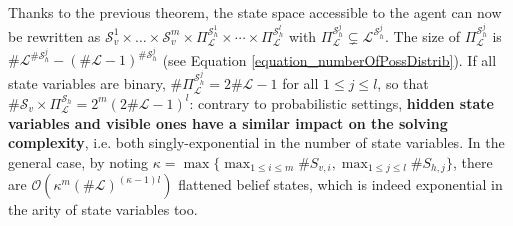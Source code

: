 Thanks to the previous theorem, the state space accessible to the agent can now be rewritten as 
$\mathcal{S}^1_v \times \ldots \times
\mathcal{S}^m_v \times \Pi^{\mathcal{S}^1_h}_{\mathcal{L}} \times \cdots \times \Pi^{\mathcal{S}^l_h}_{\mathcal{L}}$ 
with $\Pi^{\mathcal{S}^j_h}_{\mathcal{L}}
\subsetneq \mathcal{L}^{\mathcal{S}^j_h}$. 
The size of $\Pi^{\mathcal{S}^j_h}_{\mathcal{L}}$
is $\#\mathcal{L}^{\#\mathcal{S}^j_h} - (\#\mathcal{L}-1)^{\#\mathcal{S}^j_h}$
(see Equation \ref{equation_numberOfPossDistrib}). 
If all state variables are binary,
$\# \Pi^{\mathcal{S}^j_h}_{\mathcal{L}} = 2 \#\mathcal{L} - 1$ for all $1 \leqslant j \leqslant l$, so that 
$\# \mathcal{S}_v \times \Pi^{\mathcal{S}_h}_{\mathcal{L}} = 2^m (2
\#\mathcal{L} - 1)^l$: contrary to probabilistic settings, {\bf hidden state variables
and visible ones have a similar impact on the solving complexity}, i.e. both
singly-exponential in the number of state variables. 
In the general case, by noting 
$\kappa = \max\{\max_{1 \leqslant i \leqslant m} \# S_{v,i} , \max_{1 \leqslant j \leqslant l} \# S_{h,j}\}$, 
there are $\mathcal{O}(\kappa^m (\# \mathcal{L})^{(\kappa - 1) l})$ 
flattened belief states, which is indeed exponential in the
arity of state variables too. 


